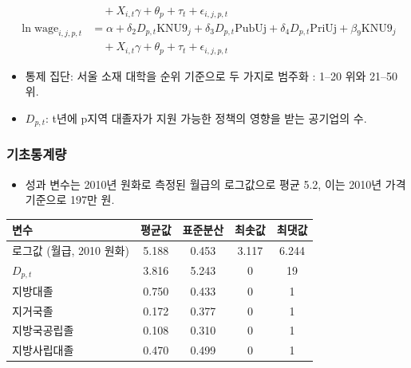 \documentclass[aspectratio=169,xcolor=dvipsnames,handout]{beamer}
\begin{document}
\begin{frame}[allowframebreaks]
\begin{enumerate}[<+->]
\begin{align}
                    &\quad + X_{i,t} \gamma + \theta_p + \tau_t + \epsilon_{i,j,p,t} \\
                \ln{\text{wage}}_{i,j,p,t} &= \alpha + \delta_2 D_{p,t} \text{KNU9}_j + \delta_3 D_{p,t} \text{PubUj} 
                    + \delta_4 D_{p,t} \text{PriUj} + \beta_9 \text{KNU9}_j \\
                    &\quad + X_{i,t} \gamma + \theta_p + \tau_t + \epsilon_{i,j,p,t} \nonumber
            \end{align}
            \begin{itemize}[<+->]
                \item 통제 집단: 서울 소재 대학을 순위 기준으로 두 가지로 범주화 : 1–20 위와 21–50 위.
                \item $D_{p,t}$: t년에 p지역 대졸자가 지원 가능한 정책의 영향을 받는 공기업의 수.
            \end{itemize}
    \end{enumerate}
\end{frame}

\begin{frame}
    \frametitle{기초통계량}
    \begin{itemize}[<+->]
        \item 성과 변수는 2010년 원화로 측정된 월급의 로그값으로 평균 5.2, 이는 2010년 가격 기준으로 197만 원.
    \end{itemize}
    \begin{table}[ht]
        \tiny
        \centering
        \begin{tabular}{lcccc}
        \toprule
        \textbf{변수} & \textbf{평균값} & \textbf{표준분산} & \textbf{최솟값} & \textbf{최댓값} \\
        \midrule
        로그값 (월급, 2010 원화) & 5.188 & 0.453 & 3.117 & 6.244 \\
        $D_{p,t}$ & 3.816 & 5.243 & 0 & 19 \\
        지방대졸 & 0.750 & 0.433 & 0 & 1 \\
        지거국졸 & 0.172 & 0.377 & 0 & 1 \\
        지방국공립졸 & 0.108 & 0.310 & 0 & 1 \\
        지방사립대졸 & 0.470 & 0.499 & 0 & 1 \\
        \bottomrule
        \end{tabular}
    \end{table}
\end{frame}
\end{document}
